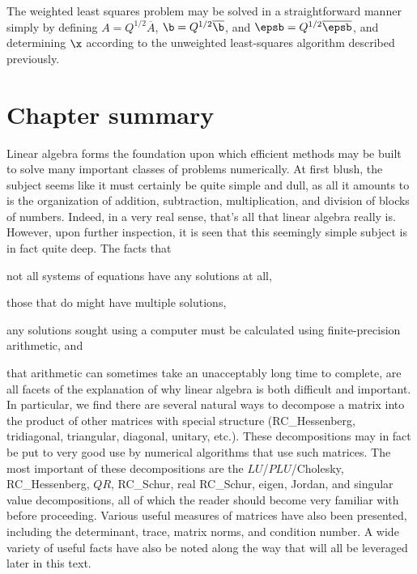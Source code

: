 The weighted least squares problem may be solved in a straightforward
manner simply by defining $A=Q^{1/2} \overline{A}$, $\b=Q^{1/2}
\overline{\b}$, and $\epsb=Q^{1/2} \overline{\epsb}$, and determining
$\x$ according to the unweighted least-squares algorithm
described previously.

%
%
%
%

\section{Chapter summary}

Linear algebra forms the foundation upon which efficient methods may
be built to solve many important classes of problems numerically.  
At first blush, the subject seems like it must certainly be quite simple and dull, as all it amounts to is
the organization of addition, subtraction, multiplication, and division of blocks
of numbers.  Indeed, in a very real sense, that's all that linear algebra really is.
However, upon further inspection, it is seen that this seemingly simple subject is in fact quite
deep.  The facts that
\beginmylistb
\item not all systems of equations have any solutions at all,
\item those that do might have multiple solutions,
\item any solutions sought using a computer must be calculated using finite-precision arithmetic, and
\item that arithmetic can sometimes take an unacceptably long time to complete,
\endmylist
\noindent are all facets of the explanation of why linear algebra is both difficult and important.  In particular,
we find there are several natural ways to decompose a matrix into the product of other matrices with
special structure (RC_Hessenberg, tridiagonal, triangular, diagonal, unitary, etc.).  These decompositions
may in fact be put to very good use by numerical algorithms that use such matrices.  The most
important of these decompositions are the $LU$/$PLU$/Cholesky, RC_Hessenberg, $QR$, RC_Schur, real RC_Schur, eigen,
Jordan, and singular value decompositions, all of which the reader should become very familiar with before proceeding.  
Various useful measures of matrices have also been presented, including the determinant, trace, matrix norms,
and condition number. A wide variety of useful facts have also be noted along the way that will all be leveraged later in this text.

